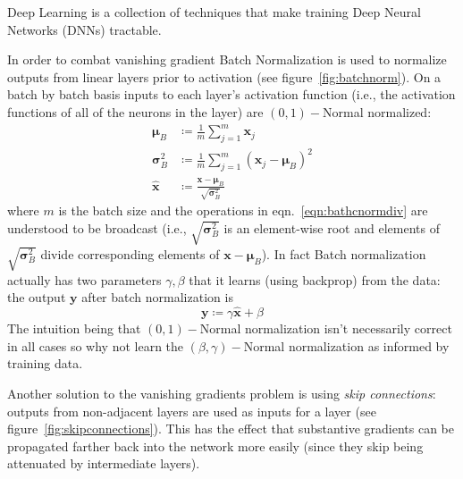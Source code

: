 Deep Learning is a collection of techniques that make training Deep Neural Networks (DNNs) tractable.
%


In order to combat vanishing gradient Batch Normalization \cite{ioffe2015batch} is used to normalize outputs from linear layers prior to activation (see figure~\ref{fig:batchnorm}).
%
On a batch by batch basis inputs to each layer's activation function (i.e., the activation functions of all of the neurons in the layer) are \((0,1)-\)Normal normalized:
\begin{align}
    \bm{\mu} _{B}        & \coloneqq {\frac {1}{m}}\sum _{j=1}^{m}\bm{x}_{j}                                             \\
    \bm{\sigma} _{B}^{2} & \coloneqq{\frac {1}{m}}\sum _{j=1}^{m}(\bm{x}_{j}-\bm{\mu}_{B})^{2}                           \\
    {\hat {\bm{x}}}      & \coloneqq {\frac {\bm{x}-\bm{\mu}_{B}}{\sqrt {\bm{\sigma}_{B}^{2}}}} \label{eqn:bathcnormdiv}
\end{align}
where \(m\) is the batch size and the operations in eqn.~\eqref{eqn:bathcnormdiv} are understood to be broadcast (i.e., \(\sqrt {\bm{\sigma} _{B}^{2}}\) is an element-wise root and elements of \(\sqrt {\bm{\sigma} _{B}^{2}}\) divide corresponding elements of \(\bm{x}-\bm{\mu}_{B}\)).
%
In fact Batch normalization actually has two parameters \(\gamma, \beta\) that it learns (using backprop) from the data: the output \(\bm{y}\) after batch normalization is
\begin{equation}
    \bm{y} \coloneqq \gamma \bm{\hat{x}} + \beta 
\end{equation}
The intuition being that \((0,1)-\)Normal normalization isn't necessarily correct in all cases so why not learn the \((\beta,\gamma)-\)Normal normalization as informed by training data.
%


Another solution to the vanishing gradients problem is using \textit{skip connections}: outputs from non-adjacent layers are used as inputs for a layer (see figure~\ref{fig:skipconnections}).
%
This has the effect that substantive gradients can be propagated farther back into the network more easily (since they skip being attenuated by intermediate layers).

